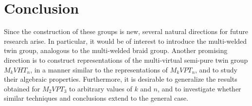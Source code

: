 \documentclass[preprint]{elsarticle}
\begin{document}
\section{Conclusion}

Since the construction of these groups is new, several natural directions for future research arise. In particular, it would be of interest to introduce the multi-welded twin group, analogous to the multi-welded braid group. Another promising direction is to construct representations of the multi-virtual semi-pure twin group $M_kVHT_n$, in a manner similar to the representations of $M_kVPT_n$, and to study their algebraic properties. Furthermore, it is desirable to generalize the results obtained for $M_2VPT_3$ to arbitrary values of $k$ and $n$, and to investigate whether similar techniques and conclusions extend to the general case.
\end{document}
